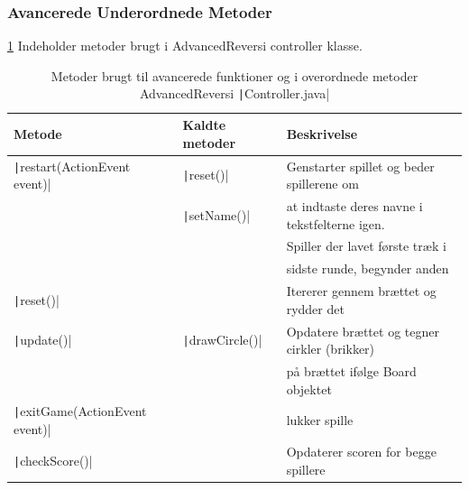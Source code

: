 \subsubsection{Avancerede Underordnede Metoder}
\cref{tbl:2} Indeholder metoder brugt i AdvancedReversi controller klasse.\newline
\begin{table}[H]
    \centering
    \caption{Metoder brugt til avancerede funktioner og i overordnede metoder AdvancedReversi \texttt|Controller.java|}\label{tbl:2}
    \begin{tabular}{lll}
        \toprule
        Metode                                              & Kaldte metoder                     & Beskrivelse                                               \\
        \midrule
        \texttt|restart(ActionEvent event)|       & \texttt|reset()|         & Genstarter spillet og beder spillerene om                 \\
                                                            & \texttt|setName()|       & at indtaste deres navne i tekstfelterne igen.             \\
                                                            &                                    & Spiller der lavet første træk i                           \\
                                                            &                                    & sidste runde, begynder anden                              \\
        \texttt|reset()|                          &                                    & Itererer gennem brættet og rydder det                     \\
        \texttt|update()|                         & \texttt|drawCircle()|    & Opdatere brættet og tegner cirkler (brikker)              \\
                                                            &                                    & på brættet ifølge Board objektet                          \\
        \texttt|exitGame(ActionEvent event)|      &                                    & lukker spille                                             \\
        \texttt|checkScore()|                     &                                    & Opdaterer scoren for begge spillere                       \\

\end{tabular}
\end{table}
